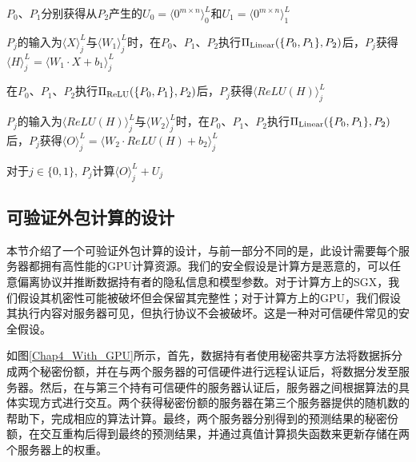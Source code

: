 \begin{algorithm}[H]
	\SetAlgoLined
	
	
	$P_0$、$P_1$分别获得从$P_2$产生的$U_0=\langle 0^{m\times n}\rangle_0^L$和$U_1=\langle 0^{m\times n}\rangle_1^L$
	
	
	
	$P_j$的输入为$\langle X\rangle_j^L$与$\langle W_1\rangle_j^L$时，在$P_0$、$P_1$、$P_2$执行$\Pi_{\rm Linear}(\{P_0, P_1\}, P_2)$后，$P_j$获得$\langle H\rangle_j^L = \langle W_1\cdot X + b_1\rangle_j^L$ 
	
	在$P_0$、$P_1$、$P_2$执行$\Pi_{\rm ReLU}(\{P_0, P_1\}, P_2)$后，$P_j$获得$\langle ReLU(H)\rangle_j^L$ 
	
	$P_j$的输入为$\langle ReLU(H)\rangle_j^L$与$\langle W_2\rangle_j^L$时，在$P_0$、$P_1$、$P_2$执行$\Pi_{\rm Linear}(\{P_0, P_1\}, P_2)$后，$P_j$获得$\langle O\rangle_j^L = \langle W_2\cdot ReLU(H) + b_2 \rangle_j^L$ 
	
	对于$j\in \{0, 1\}$, $P_j$计算$\langle O\rangle_j^L + U_j$
	
	\caption{ $\Pi_{\rm FFN}(\{P_0, P_1\}, P_2)$ }
\end{algorithm}

\subsection{可验证外包计算的设计}

本节介绍了一个可验证外包计算的设计，与前一部分不同的是，此设计需要每个服务器都拥有高性能的GPU计算资源。我们的安全假设是计算方是恶意的，可以任意偏离协议并推断数据持有者的隐私信息和模型参数。对于计算方上的SGX，我们假设其机密性可能被破坏但会保留其完整性；对于计算方上的GPU，我们假设其执行内容对服务器可见，但执行协议不会被破坏。这是一种对可信硬件常见的安全假设\cite{Cryptflow}。

如图\ref{Chap4_With_GPU}所示，首先，数据持有者使用秘密共享方法将数据拆分成两个秘密份额，并在与两个服务器的可信硬件进行远程认证后，将数据分发至服务器。然后，在与第三个持有可信硬件的服务器认证后，服务器之间根据算法的具体实现方式进行交互。两个获得秘密份额的服务器在第三个服务器提供的随机数的帮助下，完成相应的算法计算。最终，两个服务器分别得到的预测结果的秘密份额，在交互重构后得到最终的预测结果，并通过真值计算损失函数来更新存储在两个服务器上的权重。


